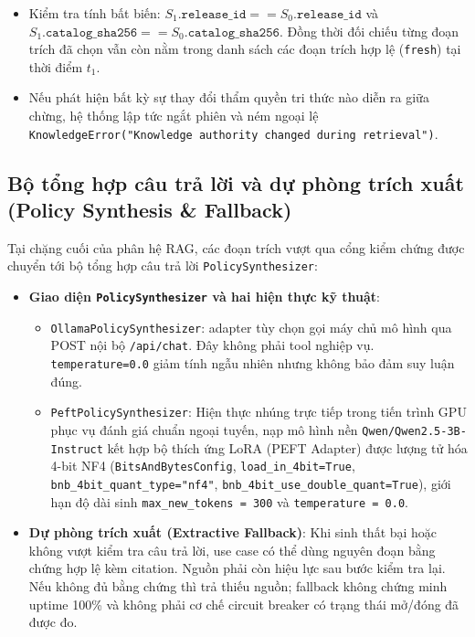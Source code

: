 \begin{enumerate}[nosep]
\begin{itemize}[nosep]
    \item Kiểm tra tính bất biến: $S_1.\texttt{release\_id} == S_0.\texttt{release\_id}$ và $S_1.\texttt{catalog\_sha256} == S_0.\texttt{catalog\_sha256}$. Đồng thời đối chiếu từng đoạn trích đã chọn vẫn còn nằm trong danh sách các đoạn trích hợp lệ (\texttt{fresh}) tại thời điểm $t_1$.
    \item Nếu phát hiện bất kỳ sự thay đổi thẩm quyền tri thức nào diễn ra giữa chừng, hệ thống lập tức ngắt phiên và ném ngoại lệ \texttt{KnowledgeError("Knowledge authority changed during retrieval")}.
  \end{itemize}
\end{enumerate}

\subsection{Bộ tổng hợp câu trả lời và dự phòng trích xuất (Policy Synthesis \& Fallback)}

Tại chặng cuối của phân hệ RAG, các đoạn trích vượt qua cổng kiểm chứng được chuyển tới bộ tổng hợp câu trả lời \texttt{PolicySynthesizer}:
\begin{itemize}[nosep]
  \item \textbf{Giao diện \texttt{PolicySynthesizer} và hai hiện thực kỹ thuật}:
  \begin{itemize}[nosep]
    \item \texttt{OllamaPolicySynthesizer}: adapter tùy chọn gọi máy chủ mô hình qua POST nội bộ \texttt{/api/chat}. Đây không phải tool nghiệp vụ. \texttt{temperature=0.0} giảm tính ngẫu nhiên nhưng không bảo đảm suy luận đúng.
    \item \texttt{PeftPolicySynthesizer}: Hiện thực nhúng trực tiếp trong tiến trình GPU phục vụ đánh giá chuẩn ngoại tuyến, nạp mô hình nền \texttt{Qwen/Qwen2.5-3B-Instruct} kết hợp bộ thích ứng LoRA (PEFT Adapter) được lượng tử hóa 4-bit NF4 (\texttt{BitsAndBytesConfig}, \texttt{load\_in\_4bit=True}, \texttt{bnb\_4bit\_quant\_type="nf4"}, \texttt{bnb\_4bit\_use\_double\_quant=True}), giới hạn độ dài sinh \texttt{max\_new\_tokens = 300} và \texttt{temperature = 0.0}.
  \end{itemize}
  \item \textbf{Dự phòng trích xuất (Extractive Fallback)}:
  Khi sinh thất bại hoặc không vượt kiểm tra câu trả lời, use case có thể dùng nguyên đoạn bằng chứng hợp lệ kèm citation. Nguồn phải còn hiệu lực sau bước kiểm tra lại. Nếu không đủ bằng chứng thì trả thiếu nguồn; fallback không chứng minh uptime 100\% và không phải cơ chế circuit breaker có trạng thái mở/đóng đã được đo.
\end{itemize}

